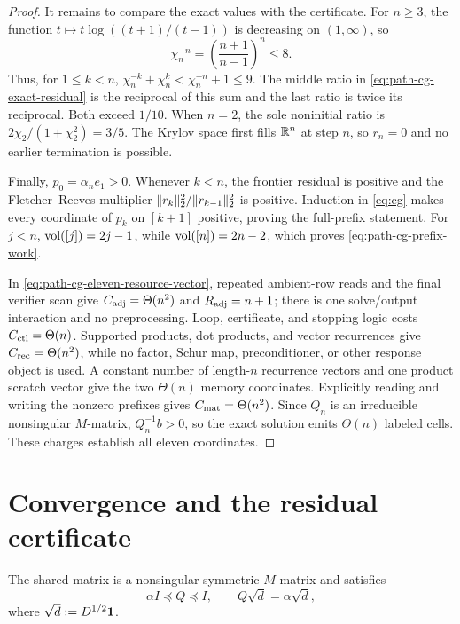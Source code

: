 \documentclass[11pt]{article}
\begin{document}
\begin{proof}
It remains to compare the exact values with the certificate.  For $n\geq3$,
the function
$t\mapsto t\log((t+1)/(t-1))$ is decreasing on $(1,\infty)$, so
\begin{equation*}
 \chi_n^{-n}=\left(\frac{n+1}{n-1}\right)^n\leq 8.
\end{equation*}
Thus, for $1\leq k<n$,
$\chi_n^{-k}+\chi_n^k<\chi_n^{-n}+1\leq9$.  The middle ratio in
\cref{eq:path-cg-exact-residual} is the reciprocal of this sum and the last
ratio is twice its reciprocal.  Both exceed $1/10$.  When $n=2$, the sole
noninitial ratio is $2\chi_2/(1+\chi_2^2)=3/5$.  The Krylov space first fills
$\mathbb{R}^n$ at step $n$, so $r_n=0$ and no earlier termination is possible.

Finally, $p_0=\alpha_n e_1>0$.  Whenever $k<n$, the frontier residual is
positive and the Fletcher--Reeves multiplier
$\lVert r_k\rVert_2^2/\lVert r_{k-1}\rVert_2^2$ is positive.  Induction in
\cref{eq:cg} makes every coordinate of $p_k$ on $[k+1]$ positive, proving the
full-prefix statement.  For $j<n$, $\operatorname{vol}([j])=2j-1$, while
$\operatorname{vol}([n])=2n-2$, which proves \cref{eq:path-cg-prefix-work}.

In \cref{eq:path-cg-eleven-resource-vector}, repeated ambient-row reads and
the final verifier scan give $C_{\rm adj}=\Theta(n^2)$ and $R_{\rm adj}=n+1$;
there is one solve/output interaction and no preprocessing.  Loop,
certificate, and stopping logic costs $C_{\rm ctl}=\Theta(n)$.  Supported
products, dot products, and vector recurrences give
$C_{\rm rec}=\Theta(n^2)$, while no factor, Schur map, preconditioner, or
other response object is used.  A constant number of length-$n$ recurrence
vectors and one product scratch vector give the two $\Theta(n)$ memory
coordinates.  Explicitly reading and writing the nonzero prefixes gives
$C_{\rm mat}=\Theta(n^2)$.  Since $Q_n$ is an irreducible nonsingular
$M$-matrix, $Q_n^{-1}b>0$, so the exact solution emits $\Theta(n)$ labeled
cells.  These charges establish all eleven coordinates.
\end{proof}

\section{Convergence and the residual certificate}
\label{sec:certificate}

The shared matrix is a nonsingular symmetric $M$-matrix and satisfies
\begin{equation}
 \alpha I\preceq Q\preceq I,
 \qquad
 Q\sqrt d=\alpha\sqrt d,
 \label{eq:q-bounds}
\end{equation}
where $\sqrt d:=D^{1/2}\mathbf{1}$.
\end{document}
